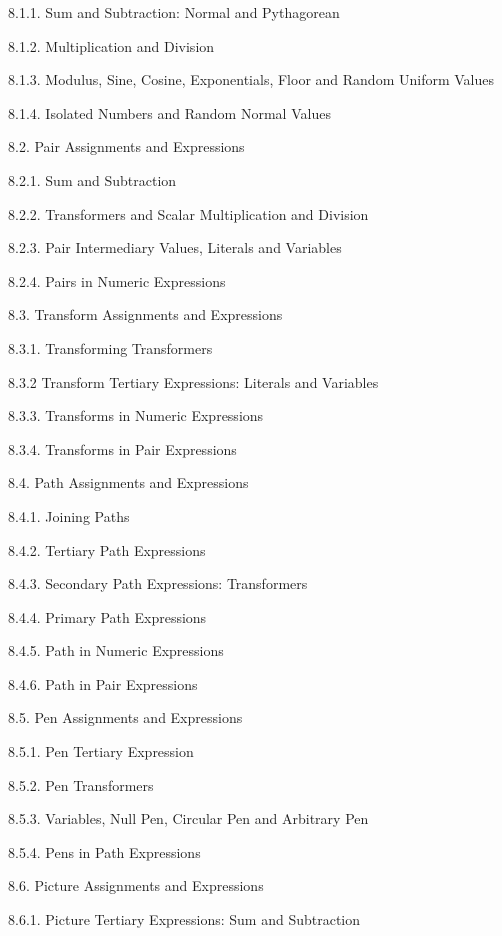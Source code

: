 8.1.1. Sum and Subtraction: Normal and Pythagorean 

8.1.2. Multiplication and Division 

8.1.3. Modulus, Sine, Cosine, Exponentials, Floor and
  Random Uniform Values 

8.1.4. Isolated Numbers and Random Normal Values 

8.2. Pair Assignments and Expressions 

8.2.1. Sum and Subtraction 

8.2.2. Transformers and Scalar Multiplication and Division 

8.2.3. Pair Intermediary Values, Literals and Variables 

8.2.4. Pairs in Numeric Expressions 

8.3. Transform Assignments and Expressions 

8.3.1. Transforming Transformers 

8.3.2 Transform Tertiary Expressions: Literals and Variables 

8.3.3. Transforms in Numeric Expressions 

8.3.4. Transforms in Pair Expressions 

8.4. Path Assignments and Expressions 

8.4.1. Joining Paths 

8.4.2. Tertiary Path Expressions 

8.4.3. Secondary Path Expressions: Transformers 

8.4.4. Primary Path Expressions 

8.4.5. Path in Numeric Expressions 

8.4.6. Path in Pair Expressions 

8.5. Pen Assignments and Expressions 

8.5.1. Pen Tertiary Expression 

8.5.2. Pen Transformers 

8.5.3. Variables, Null Pen, Circular Pen and Arbitrary Pen 

8.5.4. Pens in Path Expressions 

8.6. Picture Assignments and Expressions 

8.6.1. Picture Tertiary Expressions: Sum and Subtraction 

